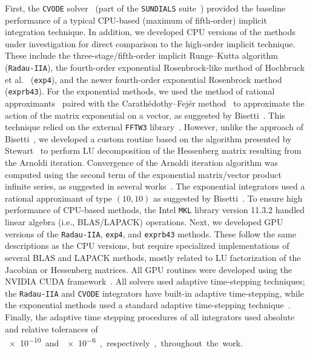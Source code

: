 \documentclass[preprint,review,11pt]{elsarticle}
\begin{document}
First, the \texttt{CVODE} solver~\cite{Hindmarsh:2005hg,cvode:2.8.2} (part of the \texttt{SUNDIALS} suite~\cite{sundials:2.6.2}) provided the baseline performance of a typical CPU-based (maximum of fifth-order) implicit integration technique.
In addition, we developed CPU versions of the methods under investigation for direct comparison to the high-order implicit technique.
These include the three-stage\slash fifth-order implicit Runge--Kutta algorithm~\cite{wanner1991solving} (\texttt{Radau-IIA}), the fourth-order exponential Rosenbrock-like method of Hochbruck et al.~\cite{Hochbruck:1998} (\texttt{exp4}), and the newer fourth-order exponential Rosenbrock method~\cite{Hockbruck:2009} (\texttt{exprb43}).
For the exponential methods, we used the method of rational approximants~\cite{gallopoulos:1992} paired with the Carath\'edothy--Fej\'er method~\cite{trefethen:2006,kyle_niemeyer_2016_44291} to approximate the action of the matrix exponential on a vector, as suggested by Bisetti~\cite{Bisetti:2012jw}.
This technique relied on the external \texttt{FFTW3} library~\cite{frigo2005design,fftw:3.3.4}.
However, unlike the approach of Bisetti~\cite{Bisetti:2012jw}, we developed a custom routine based on the algorithm presented by Stewart~\cite{stewart:1998} to perform LU decomposition of the Hessenberg matrix resulting from the Arnoldi iteration.
Convergence of the Arnoldi iteration algorithm was computed using the second term of the exponential matrix\slash vector product infinite series, as suggested in several works~\cite{Bisetti:2012jw,saad:1992}.
The exponential integrators used a rational approximant of type $\left(10,10\right)$ as suggested by Bisetti~\cite{Bisetti:2012jw}.
To ensure high performance of CPU-based methods, the Intel \texttt{MKL} library version 11.3.2 handled linear algebra (i.e., BLAS\slash LAPACK) operations.
Next, we developed GPU versions of the \texttt{Radau-IIA}, \texttt{exp4}, and \texttt{exprb43} methods.
These follow the same descriptions as the CPU versions, but require specialized implementations of several BLAS and LAPACK methods, mostly related to LU factorization of the Jacobian or Hessenberg matrices.
All GPU routines were developed using the NVIDIA CUDA framework~\cite{Buck:2008aa,NVIDIA:2015aa}.
All solvers used adaptive time-stepping techniques; the \texttt{Radau-IIA} and \texttt{CVODE} integrators have built-in adaptive time-stepping, while the exponential methods used a standard adaptive time-stepping technique~\cite{wanner1991solving}.
Finally, the adaptive time stepping procedures of all integrators used absolute and relative tolerances of \SI{e-10} and \SI{e-6}, respectively, throughout the work.
\end{document}
